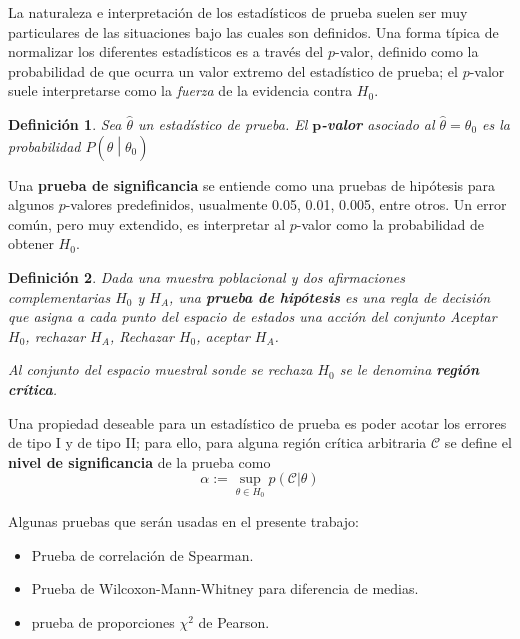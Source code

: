 \documentclass[12pt,letterpaper]{book}
\newtheorem{definicion}{Definición}[chapter]
\newcommand{\talque}{\mathrel{}\middle|\mathrel{}}
\begin{document}
La naturaleza e interpretación de los estadísticos de prueba suelen ser muy particulares de las situaciones bajo las cuales son definidos.
%
Una forma típica de normalizar los diferentes estadísticos es a través del $p$-valor, definido como la probabilidad de que ocurra un valor extremo del estadístico de prueba; 
el $p$-valor suele interpretarse como la \textit{fuerza} de la evidencia contra $H_0$.

\begin{definicion}
Sea $\widehat{\theta}$ un estadístico de prueba. El \textbf{$\boldsymbol{p}$-valor} asociado al $\widehat{\theta}=\theta_0$ es la probabilidad $P\left(\widehat{\theta} \talque \theta_0\right)$
\end{definicion}

Una \textbf{prueba de significancia} se entiende como una pruebas de hipótesis para algunos $p$-valores predefinidos, usualmente 0.05, 0.01, 0.005, entre otros.
%
Un error común, pero muy extendido, es interpretar al $p$-valor como la probabilidad de obtener $H_0$.

\begin{definicion}
Dada una muestra poblacional y dos afirmaciones complementarias $H_0$ y $H_A$, una \textbf{prueba de hipótesis} es una regla de decisión que asigna a cada punto del espacio de estados una acción del conjunto Aceptar $H_0$, rechazar $H_A$, Rechazar $H_0$, aceptar $H_A$.

Al conjunto del espacio muestral sonde se rechaza $H_0$ se le denomina \textbf{región crítica}. 
\end{definicion}

Una propiedad deseable para un estadístico de prueba es poder acotar los errores de tipo I y de tipo II; para ello, para alguna región crítica arbitraria $\mathcal{C}$ se define el \textbf{nivel de significancia} de la prueba como
\begin{equation}
\alpha := \sup_{\theta \in H_0} p(\mathcal{C} \lvert \theta)
\end{equation}

Algunas pruebas que serán usadas en el presente trabajo:
\begin{itemize}
\item Prueba de correlación de Spearman.
\item Prueba de Wilcoxon-Mann-Whitney para diferencia de medias.
\item prueba de proporciones $\chi^2$ de Pearson.
\end{itemize}

\end{document}
